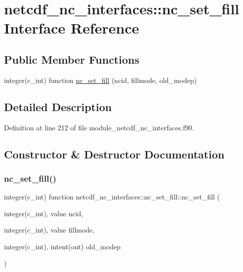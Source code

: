 \hypertarget{interfacenetcdf__nc__interfaces_1_1nc__set__fill}{}\section{netcdf\+\_\+nc\+\_\+interfaces\+:\+:nc\+\_\+set\+\_\+fill Interface Reference}
\label{interfacenetcdf__nc__interfaces_1_1nc__set__fill}
\subsection*{Public Member Functions}
\begin{DoxyCompactItemize}
\item 
integer(c\+\_\+int) function \hyperlink{interfacenetcdf__nc__interfaces_1_1nc__set__fill_a393dc9571e5a2bc629ea6d829a79d09f}{nc\+\_\+set\+\_\+fill} (ncid, fillmode, old\+\_\+modep)
\end{DoxyCompactItemize}


\subsection{Detailed Description}


Definition at line 212 of file module\+\_\+netcdf\+\_\+nc\+\_\+interfaces.\+f90.



\subsection{Constructor \& Destructor Documentation}
\mbox{\label{interfacenetcdf__nc__interfaces_1_1nc__set__fill_a393dc9571e5a2bc629ea6d829a79d09f}} 
\subsubsection{\texorpdfstring{nc\+\_\+set\+\_\+fill()}{nc\_set\_fill()}}
{\footnotesize\ttfamily integer(c\+\_\+int) function netcdf\+\_\+nc\+\_\+interfaces\+::nc\+\_\+set\+\_\+fill\+::nc\+\_\+set\+\_\+fill (\begin{DoxyParamCaption}\item[{integer(c\+\_\+int), value}]{ncid,  }\item[{integer(c\+\_\+int), value}]{fillmode,  }\item[{integer(c\+\_\+int), intent(out)}]{old\+\_\+modep }\end{DoxyParamCaption})}



